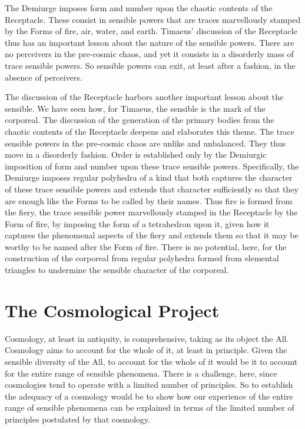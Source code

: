The Demiurge imposes form and number upon the chaotic contents of the Receptacle. These consist in sensible powers that are traces marvellously stamped by the Forms of fire, air, water, and earth. Timaeus' discussion of the Receptacle thus has an important lesson about the nature of the sensible powers. There are no perceivers in the pre-cosmic chaos, and yet it consists in a disorderly mass of trace sensible powers. So sensible powers can exit, at least after a fashion, in the absence of perceivers. 

The discussion of the Receptacle harbors another important lesson about the sensible. We have seen how, for Timaeus, the sensible is the mark of the corporeal. The discussion of the generation of the primary bodies from the chaotic contents of the Receptacle deepens and elaborates this theme. The trace sensible powers in the pre-cosmic chaos are unlike and unbalanced. They thus move in a disorderly fashion. Order is established only by the Demiurgic imposition of form and number upon these trace sensible powers. Specifically, the Demiurge imposes regular polyhedra of a kind that both captures the character of these trace sensible powers and extends that character sufficiently so that they are enough like the Forms to be called by their names. Thus fire is formed from the fiery, the trace sensible power marvellously stamped in the Receptacle by the Form of fire, by imposing the form of a tetrahedron upon it, given how it captures the phenomenal aspects of the fiery and extends them so that it may be worthy to be named after the Form of fire. There is no potential, here, for the construction of the corporeal from regular polyhedra formed from elemental triangles to undermine the sensible character of the corporeal.


\section{The Cosmological Project} %
\label{sec:the_cosmological_project}

Cosmology, at least in antiquity, is comprehensive, taking as its object the All. Cosmology aims to account for the whole of it, at least in principle. Given the sensible diversity of the All, to account for the whole of it would be it to account for the entire range of sensible phenomena. There is a challenge, here, since cosmologies tend to operate with a limited number of principles. So to establish the adequacy of a cosmology would be to show how our experience of the entire range of sensible phenomena can be explained in terms of the limited number of principles postulated by that cosmology.

